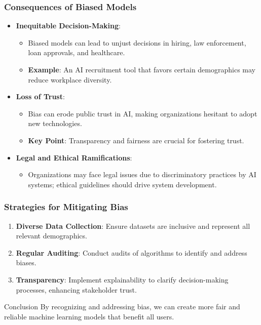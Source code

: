 \documentclass[aspectratio=169]{beamer}
\begin{document}
\begin{frame}[fragile]
    \frametitle{Consequences of Biased Models}
    \begin{itemize}
        \item \textbf{Inequitable Decision-Making}:
        \begin{itemize}
            \item Biased models can lead to unjust decisions in hiring, law enforcement, loan approvals, and healthcare.
            \item \textbf{Example}: An AI recruitment tool that favors certain demographics may reduce workplace diversity.
        \end{itemize}

        \item \textbf{Loss of Trust}:
        \begin{itemize}
            \item Bias can erode public trust in AI, making organizations hesitant to adopt new technologies.
            \item \textbf{Key Point}: Transparency and fairness are crucial for fostering trust.
        \end{itemize}

        \item \textbf{Legal and Ethical Ramifications}:
        \begin{itemize}
            \item Organizations may face legal issues due to discriminatory practices by AI systems; ethical guidelines should drive system development.
        \end{itemize}
    \end{itemize}
\end{frame}

\begin{frame}[fragile]
    \frametitle{Strategies for Mitigating Bias}
    \begin{enumerate}
        \item \textbf{Diverse Data Collection}: Ensure datasets are inclusive and represent all relevant demographics.
        \item \textbf{Regular Auditing}: Conduct audits of algorithms to identify and address biases.
        \item \textbf{Transparency}: Implement explainability to clarify decision-making processes, enhancing stakeholder trust.
    \end{enumerate}
    \begin{block}{Conclusion}
        By recognizing and addressing bias, we can create more fair and reliable machine learning models that benefit all users.
    \end{block}
\end{frame}
\end{document}
